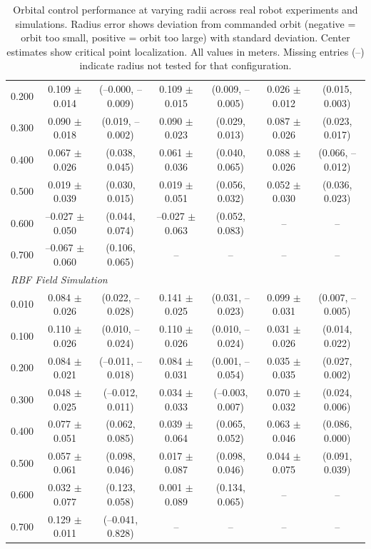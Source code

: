\documentclass[lettersize,journal]{IEEEtran}
\begin{document}
\begin{table}[h]
\begin{tabular}{ccccccc}
0.200 & 0.109 $\pm$ 0.014 & (--0.000, --0.009) & 0.109 $\pm$ 0.015 & (0.009, --0.005) & 0.026 $\pm$ 0.012 & (0.015, 0.003) \\
0.300 & 0.090 $\pm$ 0.018 & (0.019, --0.002) & 0.090 $\pm$ 0.023 & (0.029, 0.013) & 0.087 $\pm$ 0.026 & (0.023, 0.017) \\
0.400 & 0.067 $\pm$ 0.026 & (0.038, 0.045) & 0.061 $\pm$ 0.036 & (0.040, 0.065) & 0.088 $\pm$ 0.026 & (0.066, --0.012) \\
0.500 & 0.019 $\pm$ 0.039 & (0.030, 0.015) & 0.019 $\pm$ 0.051 & (0.056, 0.032) & 0.052 $\pm$ 0.030 & (0.036, 0.023) \\
0.600 & --0.027 $\pm$ 0.050 & (0.044, 0.074) & --0.027 $\pm$ 0.063 & (0.052, 0.083) & -- & -- \\
0.700 & --0.067 $\pm$ 0.060 & (0.106, 0.065) & -- & -- & -- & -- \\
\hline
\multicolumn{7}{l}{\textit{RBF Field Simulation}} \\
\hline
0.010 & 0.084 $\pm$ 0.026 & (0.022, --0.028) & 0.141 $\pm$ 0.025 & (0.031, --0.023) & 0.099 $\pm$ 0.031 & (0.007, --0.005) \\
0.100 & 0.110 $\pm$ 0.026 & (0.010, --0.024) & 0.110 $\pm$ 0.026 & (0.010, --0.024) & 0.031 $\pm$ 0.026 & (0.014, 0.022) \\
0.200 & 0.084 $\pm$ 0.021 & (--0.011, --0.018) & 0.084 $\pm$ 0.031 & (0.001, --0.054) & 0.035 $\pm$ 0.035 & (0.027, 0.002) \\
0.300 & 0.048 $\pm$ 0.025 & (--0.012, 0.011) & 0.034 $\pm$ 0.033 & (--0.003, 0.007) & 0.070 $\pm$ 0.032 & (0.024, 0.006) \\
0.400 & 0.077 $\pm$ 0.051 & (0.062, 0.085) & 0.039 $\pm$ 0.064 & (0.065, 0.052) & 0.063 $\pm$ 0.046 & (0.086, 0.000) \\
0.500 & 0.057 $\pm$ 0.061 & (0.098, 0.046) & 0.017 $\pm$ 0.087 & (0.098, 0.046) & 0.044 $\pm$ 0.075 & (0.091, 0.039) \\
0.600 & 0.032 $\pm$ 0.077 & (0.123, 0.058) & 0.001 $\pm$ 0.089 & (0.134, 0.065) & -- & -- \\
0.700 & 0.129 $\pm$ 0.011 & (--0.041, 0.828) & -- & -- & -- & -- \\
\hline
\end{tabular}
\caption{Orbital control performance at varying radii across real robot experiments and simulations. Radius error shows deviation from commanded orbit (negative = orbit too small, positive = orbit too large) with standard deviation. Center estimates show critical point localization. All values in meters. Missing entries (--) indicate radius not tested for that configuration.}
\label{tab:orbital_radius_comparison}
\end{table}
\end{document}
